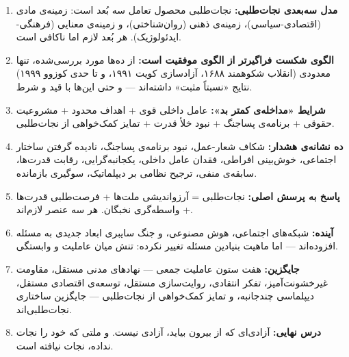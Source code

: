 \begin{tcolorbox}[wavebox, title={یافته‌های کلیدی فصل ۱۴ — جمع‌بندی نهایی}]
\begin{enumerate}
\item \textbf{مدل سه‌بعدی نجات‌طلبی:} نجات‌طلبی محصول تعامل سه بُعد است: زمینه‌ی مادی (اقتصادی-سیاسی)، زمینه‌ی ذهنی (روان‌شناختی)، و زمینه‌ی معنایی (فرهنگی-ایدئولوژیک). هر بُعد لازم اما ناکافی است.

\item \textbf{الگوی شکست فراگیرتر از الگوی موفقیت است:} از ده‌ها مورد بررسی‌شده، تنها معدودی (انقلاب شکوهمند ۱۶۸۸، آزادسازی کویت ۱۹۹۱، و تا حدی کوزوو ۱۹۹۹) نتایج «نسبتاً مثبت» داشته‌اند — و حتی این‌ها با قید و شرط.

\item \textbf{شرایط «مداخله‌ی کمتر بد»:} عامل داخلی قوی + اهداف محدود + مشروعیت حقوقی + برنامه‌ی پساجنگ + نبود خلأ قدرت + تمایز کمک‌خواهی از نجات‌طلبی.

\item \textbf{ده نشانه‌ی هشدار:} شکاف شعار-عمل، نبود برنامه‌ی پساجنگ، نادیده گرفتن ساختار اجتماعی، خوش‌بینی افراطی، فقدان عامل داخلی، یکجانبه‌گرایی، رقابت قدرت‌ها، سابقه‌ی منفی، ترجیح نظامی بر دیپلماتیک، سوگیری بازمانده.

\item \textbf{پاسخ به پرسش اصلی:} نجات‌طلبی = آرزواندیشی ملت‌ها + فرصت‌طلبی قدرت‌ها + واسطه‌گری نخبگان. هر سه عنصر لازم‌اند.

\item \textbf{آینده:} شبکه‌های اجتماعی، هوش مصنوعی، و جنگ سایبری ابعاد جدیدی به مسئله افزوده‌اند — اما ماهیت بنیادین مسئله تغییر نکرده: تنش میان عاملیت و وابستگی.

\item \textbf{جایگزین:} هفت ستون عاملیت جمعی — نهادهای مدنی مستقل، مقاومت غیرخشونت‌آمیز، تفکر انتقادی، روایت‌سازی مستقل، توسعه‌ی اقتصادی مستقل، دیپلماسی چندجانبه، و تمایز کمک‌خواهی از نجات‌طلبی — جایگزین ساختاری نجات‌طلبی‌اند.

\item \textbf{درس نهایی:} آزادی‌ای که از بیرون بیاید، آزادی نیست. و ملتی که خود را نجات نداده، نجات نیافته است.
\end{enumerate}
\end{tcolorbox}

\cleardoublepage